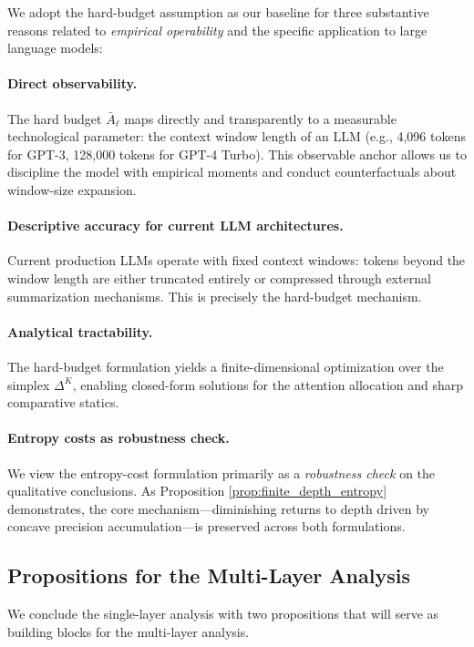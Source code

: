 We adopt the hard-budget assumption as our baseline for three substantive reasons related to \emph{empirical operability} and the specific application to large language models:

\paragraph{Direct observability.} The hard budget $\bar{A}_\ell$ maps directly and transparently to a measurable technological parameter: the context window length of an LLM (e.g., 4,096 tokens for GPT-3, 128,000 tokens for GPT-4 Turbo). This observable anchor allows us to discipline the model with empirical moments and conduct counterfactuals about window-size expansion.

\paragraph{Descriptive accuracy for current LLM architectures.} Current production LLMs operate with fixed context windows: tokens beyond the window length are either truncated entirely or compressed through external summarization mechanisms. This is precisely the hard-budget mechanism.

\paragraph{Analytical tractability.} The hard-budget formulation yields a finite-dimensional optimization over the simplex $\Delta^{K}$, enabling closed-form solutions for the attention allocation and sharp comparative statics.

\paragraph{Entropy costs as robustness check.} We view the entropy-cost formulation primarily as a \emph{robustness check} on the qualitative conclusions. As Proposition \ref{prop:finite_depth_entropy} demonstrates, the core mechanism---diminishing returns to depth driven by concave precision accumulation---is preserved across both formulations.

\subsection{Propositions for the Multi-Layer Analysis}
\label{subsec:single_multi_building}

We conclude the single-layer analysis with two propositions that will serve as building blocks for the multi-layer analysis.

